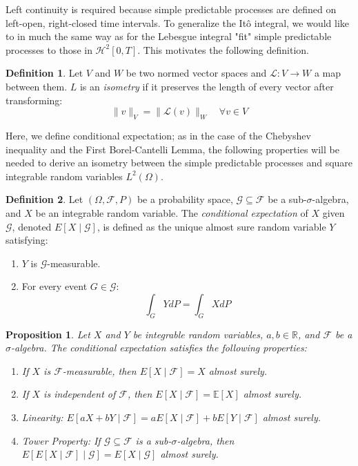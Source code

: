 \documentclass[12pt]{article}
\theoremstyle{definition}
\newtheorem{definition}{Definition}[section]
\theoremstyle{plain}
\newtheorem{proposition}{Proposition}[section]
\theoremstyle{remark}
\begin{document}
Left continuity is required because simple predictable processes are defined on left-open, right-closed time intervals.  To generalize the It\^o integral, we would like to in much the same way as for the Lebesgue integral "fit" simple predictable processes to those in $\mathcal{H}^2[0,T]$.  This motivates the following definition.

\begin{definition}
Let $V$ and $W$ be two normed vector spaces and $\mathcal{L}: V \to W$ a map between them.  $L$ is an \textit{isometry} if it preserves the length of every vector after transforming:
\[
\|v \|_V = \| \mathcal{L}(v)\|_W \quad \forall v \in V
\]
\end{definition}

Here, we define conditional expectation; as in the case of the Chebyshev inequality and the First Borel-Cantelli Lemma, the following properties will be needed to derive an isometry between the simple predictable processes and square integrable random variables $L^2(\Omega)$.

\begin{definition}
Let $(\Omega, \mathcal{F}, P)$ be a probability space, $\mathcal{G} \subseteq \mathcal{F}$ be a sub-$\sigma$-algebra, and $X$ be an integrable random variable. The \textit{conditional expectation} of $X$ given $\mathcal{G}$, denoted $E[X \mid \mathcal{G}]$, is defined as the unique almost sure random variable $Y$ satisfying:
\begin{enumerate}[label=(\roman*)]
\item $Y$ is $\mathcal{G}$-measurable.
\item For every event $G \in \mathcal{G}$:
\[
\int_G Y dP = \int_G X dP 
\]
\end{enumerate}
\end{definition}

\begin{proposition}
Let $X$ and $Y$ be integrable random variables, $a, b \in \mathbb{R}$, and $\mathcal{F}$ be a $\sigma$-algebra. The conditional expectation satisfies the following properties:
\begin{enumerate}[label=(\roman*)]
\item If $X$ is $\mathcal{F}$-measurable, then $E[X \mid \mathcal{F}] = X$ almost surely.
\item If $X$ is independent of $\mathcal{F}$, then $E[X \mid \mathcal{F}] = \mathbb{E}[X]$ almost surely.
\item Linearity: $E[aX + bY \mid \mathcal{F}] = aE[X \mid \mathcal{F}] + bE[Y \mid \mathcal{F}]$ almost surely.
\item Tower Property: If $\mathcal{G} \subseteq \mathcal{F}$ is a sub-$\sigma$-algebra, then $E[E[X \mid \mathcal{F}] \mid \mathcal{G}] = E[X \mid \mathcal{G}]$ almost surely.
\end{enumerate}
\end{proposition}
\end{document}
